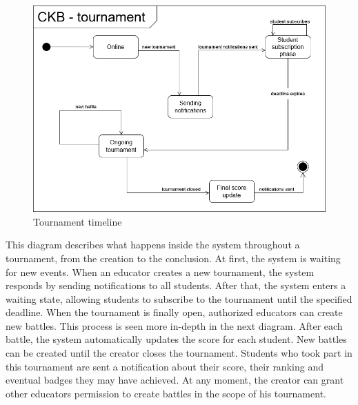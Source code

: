 \begin{figure}[H]
      \centering
      \includegraphics[scale=0.4]{src/state_diagrams/tournament_uml.png}
      \caption{Tournament timeline}
\end{figure} \vspace{1cm}
    This diagram describes what happens inside the system throughout a tournament, from the creation to the conclusion. At first, the system is waiting for new events. When an educator creates a new tournament, the system responds by sending notifications to all students. After that, the system enters a waiting state, allowing students to subscribe to the tournament until the specified deadline. When the tournament is finally open, authorized educators can create new battles. This process is seen more in-depth in the next diagram. After each battle, the system automatically updates the score for each student. New battles can be created until the creator closes the tournament. Students who took part in this tournament are sent a notification about their score, their ranking and eventual badges they may have achieved. At any moment, the creator can grant other educators permission to create battles in the scope of his tournament.\\

